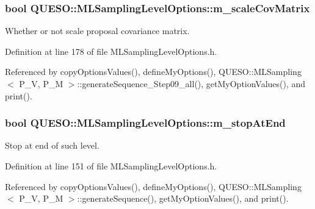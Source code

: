 \hypertarget{class_q_u_e_s_o_1_1_m_l_sampling_level_options_ac7deaeedd0deebf8ee14414fa3dbd334}{
\subsubsection[{m\-\_\-scale\-Cov\-Matrix}]{\setlength{\rightskip}{0pt plus 5cm}bool Q\-U\-E\-S\-O\-::\-M\-L\-Sampling\-Level\-Options\-::m\-\_\-scale\-Cov\-Matrix}}\label{class_q_u_e_s_o_1_1_m_l_sampling_level_options_ac7deaeedd0deebf8ee14414fa3dbd334}


Whether or not scale proposal covariance matrix. 



Definition at line 178 of file M\-L\-Sampling\-Level\-Options.\-h.



Referenced by copy\-Options\-Values(), define\-My\-Options(), Q\-U\-E\-S\-O\-::\-M\-L\-Sampling$<$ P\-\_\-\-V, P\-\_\-\-M $>$\-::generate\-Sequence\-\_\-\-Step09\-\_\-all(), get\-My\-Option\-Values(), and print().

\hypertarget{class_q_u_e_s_o_1_1_m_l_sampling_level_options_adbdb0fa054244261b7beb2cead72ef06}{
\subsubsection[{m\-\_\-stop\-At\-End}]{\setlength{\rightskip}{0pt plus 5cm}bool Q\-U\-E\-S\-O\-::\-M\-L\-Sampling\-Level\-Options\-::m\-\_\-stop\-At\-End}}\label{class_q_u_e_s_o_1_1_m_l_sampling_level_options_adbdb0fa054244261b7beb2cead72ef06}


Stop at end of such level. 



Definition at line 151 of file M\-L\-Sampling\-Level\-Options.\-h.



Referenced by copy\-Options\-Values(), define\-My\-Options(), Q\-U\-E\-S\-O\-::\-M\-L\-Sampling$<$ P\-\_\-\-V, P\-\_\-\-M $>$\-::generate\-Sequence(), get\-My\-Option\-Values(), and print().

